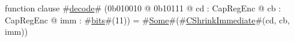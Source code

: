 function clause #\hyperref[zdecode]{decode}# (0b010010 @ 0b10111 @ cd : CapRegEnc @ cb : CapRegEnc @ imm : #\hyperref[zbits]{bits}#(11)) = #\hyperref[zSome]{Some}#(#\hyperref[zCShrinkImmediate]{CShrinkImmediate}#(cd, cb, imm))
